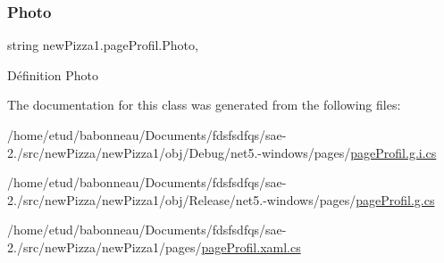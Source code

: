\subsubsection{\texorpdfstring{Photo}{Photo}}
{\footnotesize\ttfamily string new\+Pizza1.\+page\+Profil.\+Photo\hspace{0.3cm}{\ttfamily [get]}, {\ttfamily [set]}}



Définition Photo 



The documentation for this class was generated from the following files\+:\begin{DoxyCompactItemize}
\item 
/home/etud/babonneau/\+Documents/fdsfsdfqs/sae-\/2./src/new\+Pizza/new\+Pizza1/obj/\+Debug/net5.-\/windows/pages/\hyperlink{net5_80-windows_2pages_2pageProfil_8g_8i_8cs}{page\+Profil.\+g.\+i.\+cs}\item 
/home/etud/babonneau/\+Documents/fdsfsdfqs/sae-\/2./src/new\+Pizza/new\+Pizza1/obj/\+Release/net5.-\/windows/pages/\hyperlink{pageProfil_8g_8cs}{page\+Profil.\+g.\+cs}\item 
/home/etud/babonneau/\+Documents/fdsfsdfqs/sae-\/2./src/new\+Pizza/new\+Pizza1/pages/\hyperlink{pageProfil_8xaml_8cs}{page\+Profil.\+xaml.\+cs}\end{DoxyCompactItemize}
